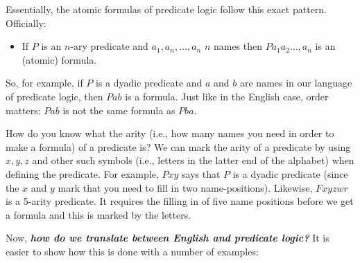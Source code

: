 \documentclass[
]{book}
\providecommand{\tightlist}{%
  \setlength{\itemsep}{0pt}\setlength{\parskip}{0pt}}
\begin{document}
Essentially, the atomic formulas of predicate logic follow this exact pattern. Officially:

\begin{itemize}
\tightlist
\item
  If \(P\) is an \(n\)-ary predicate and \(a_1,a_n,\ldots,a_n\) \(n\) names then \(Pa_1a_2\ldots,a_n\) is an (atomic) formula.
\end{itemize}

So, for example, if \(P\) is a dyadic predicate and \(a\) and \(b\) are names in our language of predicate logic, then \(Pab\) is a formula. Just like in the English case, order matters: \(Pab\) is not the same formula as \(Pba\).

How do you know what the arity (i.e., how many names you need in order to make a formula) of a predicate is? We can mark the arity of a predicate by using \(x,y,z\) and other such symbols (i.e., letters in the latter end of the alphabet) when defining the predicate. For example, \(Pxy\) says that \(P\) is a dyadic predicate (since the \(x\) and \(y\) mark that you need to fill in two name-positions). Likewise, \(Fxyzwr\) is a 5-arity predicate. It requires the filling in of five name positions before we get a formula and this is marked by the letters.

Now, \textbf{\emph{how do we translate between English and predicate logic?}} It is easier to show how this is done with a number of examples:
\end{document}
